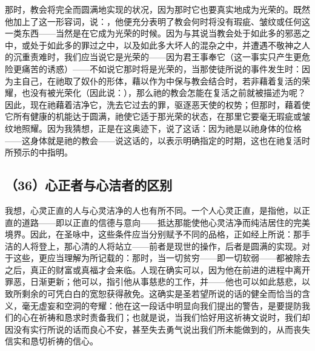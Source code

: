 那时，教会将完全而圆满地实现的状况，因为那时它也要真实地成为光荣的。既然他加上了这一形容词，说：，他便充分表明了教会何时将没有瑕疵、皱纹或任何这一类东西——当然是在它成为光荣的时候。因为与其说当教会处于如此多的邪恶之中，或处于如此多的罪过之中，以及如此多大坏人的混杂之中，并遭遇不敬神之人的沉重责难时，我们应当说它是光荣的——因为君王事奉它（这一事实只产生更危险更痛苦的诱惑）——不如说它那时将是光荣的，当那使徒所说的事件发生时：因为主自己，在祂取了奴仆的形体，藉以作为中保与教会结合时，若非藉着复活的荣耀，也没有被光荣化（因此说：），那么祂的教会怎能在复活之前就被描述为呢？因此，现在祂藉着洁净它，洗去它过去的罪，驱逐恶天使的权势；但那时，藉着使它所有健康的机能达于圆满，祂使它适于那光荣的状态，在那里它要毫无瑕疵或皱纹地照耀。因为我猜想，正是在这奥迹下，说了这话：因为祂是以祂身体的位格——这身体就是祂的教会——说这话的，以表示明确指定的时期，这也在祂复活时所预示的中指明。\newline{}\par


\subsection{（36）心正者与心洁者的区别}

我想，心灵正直的人与心灵洁净的人也有所不同。一个人心灵正直，是指他，以正直的道路——即以正直的信德与意向——抵达那能使他心灵洁净而纯洁居住的完美境界。因此，在圣咏中，这些条件应当分别赋予不同的品格，正如经上所说：那手洁的人将登上，那心清的人将站立——前者是现世的操作，后者是圆满的实现。对于这些，更应当理解为所记载的：那时，当一切贫穷——即一切软弱——都被除去之后，真正的财富或真福才会来临。人现在确实可以，因为他在前进的进程中离开罪恶，日渐更新；他可以，指引他从事慈悲的工作，并——他也可以如此慈悲，以致所剩余的可凭白白的宽恕获得赦免。这确实是圣若望所说的话的健全而恰当的含义，毫无虚妄和空洞的夸耀：他在这一段话中明显向我们提出的警告，是要提防我们的心在祈祷和恳求时责备我们；也就是说，当我们恰好用这祈祷文说时，我们却因没有实行所说的话而良心不安，甚至失去勇气说出我们所未能做到的，从而丧失信实和恳切祈祷的信心。\par

